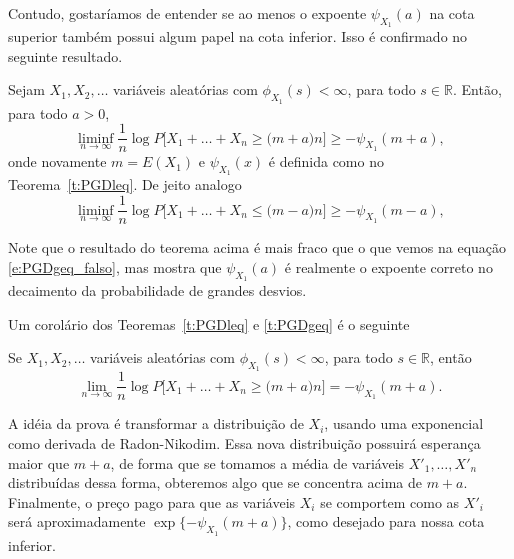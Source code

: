 Contudo, gostaríamos de entender se ao menos o expoente $\psi_{X_1}(a)$ na cota superior também possui algum papel na cota inferior.
Isso é confirmado no seguinte resultado.

\begin{theorem}
  \label{t:PGDgeq}
  Sejam $X_1, X_2, \dots$ variáveis aleatórias \iid com $\phi_{X_1}(s) < \infty$, para todo $s \in \mathbb{R}$.
  Então, para todo $a > 0$,
  \begin{equation}
    \liminf_{n \to \infty} \frac{1}{n} \log P\big[ X_1 + \dots + X_n \geq \big(m + a \big) n \big] \geq -\psi_{X_1}(m + a),
  \end{equation}
  onde novamente $m = E(X_1)$ e $\psi_{X_1}(x)$ é definida como no Teorema~\ref{t:PGDleq}.
  De jeito analogo 
    \begin{equation}
    \liminf_{n \to \infty} \frac{1}{n} \log P\big[ X_1 + \dots + X_n \leq \big(m - a \big) n \big] \geq -\psi_{X_1}(m - a),
  \end{equation}
\end{theorem}

Note que o resultado do teorema acima é mais fraco que o que vemos na equação \eqref{e:PGDgeq_falso}, mas mostra que $\psi_{X_1}(a)$ é realmente o expoente correto no decaimento da probabilidade de grandes desvios.

Um corolário dos Teoremas~\ref{t:PGDleq} e \ref{t:PGDgeq} é o seguinte

\begin{corollary}
  Se $X_1, X_2, \dots$ variáveis aleatórias \iid com $\phi_{X_1}(s) < \infty$, para todo $s \in \mathbb{R}$, então
  \begin{equation}
    \lim_{n \to \infty} \frac{1}{n} \log P\big[ X_1 + \dots + X_n \geq \big(m + a \big) n \big] = -\psi_{X_1}(m + a).
  \end{equation}
\end{corollary}

A idéia da prova é transformar a distribuição de $X_i$, usando uma exponencial como derivada de Radon-Nikodim.
Essa nova distribuição possuirá esperança maior que $m + a$, de forma que se tomamos a média de variáveis \iid $X'_1, \dots, X'_n$ distribuídas dessa forma, obteremos algo que se concentra acima de $m + a$.
Finalmente, o preço pago para que as variáveis $X_i$ se comportem como as $X'_i$ será aproximadamente $\exp\{-\psi_{X_1}(m + a)\}$, como desejado para nossa cota inferior.

